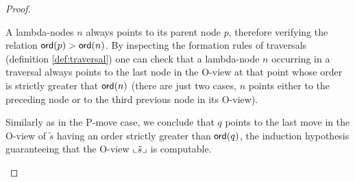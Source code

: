 \begin{proof}
\begin{itemize}
A lambda-nodes $n$ always points to its parent node $p$, therefore
verifying the relation ${\sf ord}(p) > {\sf ord}(n)$. By inspecting the
formation rules of traversals (definition \ref{def:traversal}) one
can check that a lambda-node $n$ occurring in a traversal always
points to the last node in the O-view at that point whose order is
strictly greater that ${\sf ord}(n)$ (there are just two cases, $n$
points either to the preceding node or to the third previous node in
its O-view).

Similarly as in the P-move case, we conclude that $q$ points to the last move in
the O-view of $\tilde{s}$ having an order strictly greater than ${\sf ord}(q)$,
the induction hypothesis guaranteeing that the O-view $\llcorner \tilde{s} \lrcorner$ is computable.

\end{itemize}

\end{proof}

